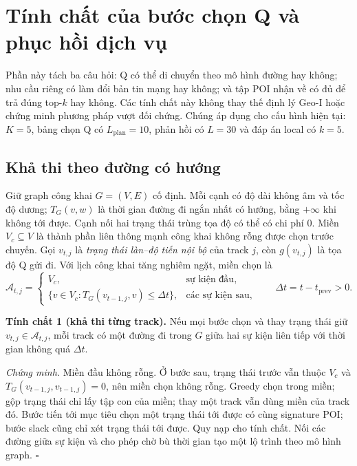 \section{Tính chất của bước chọn Q và phục hồi dịch vụ}
\label{sec:formal-current-service}

Phần này tách ba câu hỏi: Q có thể di chuyển theo mô hình đường hay không;
nhu cầu riêng có làm đổi bản tin mạng hay không; và tập POI nhận về có đủ
để trả đúng top-$k$ hay không. Các tính chất này không thay thế định lý
Geo-I hoặc chứng minh phương pháp vượt đối chứng. Chúng áp dụng cho cấu
hình hiện tại: $K=5$, bảng chọn Q có $L_{\mathrm{plan}}=10$, phản hồi
có $L=30$ và đáp án local có $k=5$.

\subsection{Khả thi theo đường có hướng}
\label{sec:formal-service-reachability}

Giữ graph công khai $G=(V,E)$ cố định. Mỗi cạnh có độ dài không âm và tốc
độ dương; $T_G(v,w)$ là thời gian đường đi ngắn nhất có hướng, bằng
$+\infty$ khi không tới được. Cạnh nối hai trạng thái trùng tọa độ có thể
có chi phí 0. Miền $V_c\subseteq V$ là thành phần liên thông mạnh công
khai không rỗng được chọn trước chuyến. Gọi $v_{t,j}$ là \emph{trạng thái
làn--độ tiến nội bộ} của track $j$, còn $g(v_{t,j})$ là tọa độ Q gửi đi.
Với lịch công khai tăng nghiêm ngặt, miền chọn là
\begin{equation}
 \mathcal A_{t,j}=\begin{cases}
 V_c,&\text{sự kiện đầu},\\
 \{v\in V_c:T_G(v_{t-1,j},v)\leq\Delta t\},&\text{các sự kiện sau},
 \end{cases}
 \qquad \Delta t=t-t_{\mathrm{prev}}>0.
 \label{eq:formal-service-buckets}
\end{equation}

\noindent\textbf{Tính chất 1 (khả thi từng track).}
Nếu mọi bước chọn và thay trạng thái giữ $v_{t,j}\in\mathcal A_{t,j}$,
mỗi track có một đường đi trong $G$ giữa hai sự kiện liên tiếp với thời
gian không quá $\Delta t$.

\noindent\emph{Chứng minh.}
Miền đầu không rỗng. Ở bước sau, trạng thái trước vẫn thuộc $V_c$ và
$T_G(v_{t-1,j},v_{t-1,j})=0$, nên miền chọn không rỗng. Greedy chọn trong
miền; gộp trạng thái chỉ lấy tập con của miền; thay một track vẫn dùng
miền của track đó. Bước tiến tới mục tiêu chọn một trạng thái tới được
có cùng signature POI; bước slack cũng chỉ xét trạng thái tới được.
Quy nạp cho tính chất. Nối các đường giữa sự kiện và cho phép chờ bù thời
gian tạo một lộ trình theo mô hình graph. \hfill$\square$

